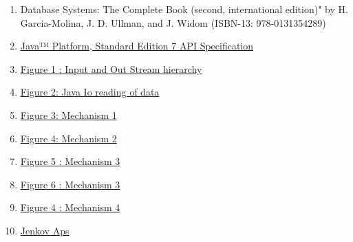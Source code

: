 \documentclass{article}
\begin{document}
    \begin{enumerate}

        \item  Database Systems: The Complete Book (second, international edition)" by H. Garcia-Molina, J. D. Ullman, and J. Widom (ISBN-13: 978-0131354289)

        \item \href{https://docs.oracle.com/javase/7/docs/api/overview-summary.html}{Java™ Platform, Standard Edition 7
        API Specification}
        \item  \href{https://www.google.com/search?q=input+stream+hierarchy&source=lnms&tbm=isch&sa=X&ved=0ahUKEwj9n9eWpZ_fAhUKzKQKHfaACb0Q_AUIDigB&biw=1366&bih=646#imgrc=Xbj3BKTrSTNGZM:}{Figure 1 : Input and Out Stream hierarchy }

        \item \href{http://tutorials.jenkov.com/java-nio/nio-vs-io.html}{Figure 2: Java Io reading of data}

        \item \href{https://www.google.com/search?biw=1366&bih=646&tbm=isch&sa=1&ei=kZ4TXPP5G461sAeWxKWgAw&q=datainputstream&oq=datainputstream&gs_l=img.3..35i39j0i19.74343.80934..81271...0.0..0.86.918.15......1....1..gws-wiz-img.......0j0i67j0i30i19.Rg1qcvj8v9Y#imgrc=MRbSWbZnatg-8M:}{Figure 3: Mechanism 1}

        \item \href{https://www.google.com/search?biw=1366&bih=646&tbm=isch&sa=1&ei=050TXIeND8jSkgWJmJb4AQ&q=fileinputstream+in+java&oq=fileInput&gs_l=img.3.0.0i19l2j0i30i19.182482.184642..188772...0.0..0.68.561.9......1....1..gws-wiz-img.......0j35i39j0i67j0i30j0i5i10i30j0i10i19j0i5i10i30i19j0i5i30i19.OTF1fI5reag#imgrc=m6lNYaxceTUCoM:}{Figure 4: Mechanism 2}

        \item \href{https://www.google.com/search?biw=1366&bih=646&tbm=isch&sa=1&ei=L6ATXPnGPNKYkwXX-4qgDQ&q=buffer+java&oq=buffer+java&gs_l=img.3..0i19j0i8i30i19.2357.3835..4507...0.0..0.72.323.5......1....1..gws-wiz-img.......0j0i67j0i10i19j0i30i19j0i5i30i19.KntnYA7ZfZM#imgdii=My8OPyhCq7u_6M:&imgrc=GGdCTHcprGiAaM:}{Figure 5 : Mechanism 3 }

        \item \href{http://tutorials.jenkov.com/java-nio/buffers.html}{Figure 6 : Mechanism 3 }

        \item \href{https://www.google.com/search?biw=1366&bih=646&tbm=isch&sa=1&ei=1p8TXOnAGsLWwQLj56rYBg&q=memory-mapped+file&oq=memory&gs_l=img.3.0.35i39l2j0l8.28492.29811..31289...0.0..0.66.373.6......1....1..gws-wiz-img.......0i67.HAODKhJsJ24#imgrc=OSoWWby55ER2jM:}{Figure 4 : Mechanism 4}

        \item \href{http://tutorials.jenkov.com/}{Jenkov Aps}

    \end{enumerate}
\end{document}
